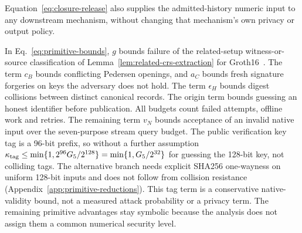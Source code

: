 \documentclass[conference,compsoc]{IEEEtran}
\theoremstyle{definition}
\numberwithin{equation}{section}
\numberwithin{table}{section}
\numberwithin{figure}{section}
\theoremstyle{plain}
\begin{document}
\label{lem:dp-input-correctness}
Equation~\eqref{eq:closure-release} also supplies the admitted-history numeric
input to any downstream mechanism, without changing that mechanism's own
privacy or output policy.

In Eq.~\eqref{eq:primitive-bounds}, \(g\) bounds failure of the related-setup
witness-or-source classification of Lemma~\ref{lem:related-crs-extraction}
for Groth16~\cite{Groth2016pairing}. The term \(c_B\) bounds conflicting
Pedersen openings, and \(a_C\) bounds fresh signature forgeries on keys
the adversary does not hold. The term \(\epsilon_H\) bounds digest collisions
between distinct canonical records. The origin term bounds guessing an
honest identifier before publication. All budgets count failed attempts, offline work and
retries. The remaining term \(v_N\) bounds acceptance of an invalid native
input over the seven-purpose stream query budget. The public verification
key tag is a 96-bit prefix, so without a further assumption
\(\kappa_{\rm tag}\le\min\{1,2^{96}G_5/2^{128}\}
=\min\{1,G_5/2^{32}\}\) for guessing the 128-bit key, not colliding tags.
The alternative branch needs explicit SHA256 one-wayness on uniform 128-bit
inputs and does not follow from collision resistance
(Appendix~\ref{app:primitive-reductions}). This tag term is a conservative
native-validity bound, not a measured attack probability or a privacy term.
The remaining primitive advantages stay symbolic because the analysis does not
assign them a common numerical security level.
\end{document}
